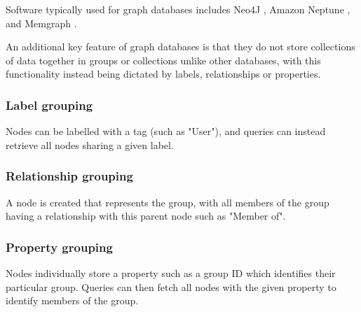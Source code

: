\para Software typically used for graph databases includes Neo4J \autocite{neo4jNeo4jGraphDatabase2025}, Amazon 
Neptune \autocite{awsManagedGraphDatabase}, and Memgraph \autocite{memgraphMemgraphDatabase}.

\para An additional key feature of graph databases is that they do not store collections of data together in groups or collections 
unlike other databases, with this functionality instead being dictated by labels, relationships or properties. 

\subsubsection{Label grouping}
Nodes can be labelled with a tag (such as "User"), and queries can instead retrieve all nodes sharing a given label.

\subsubsection{Relationship grouping}
A node is created that represents the group, with all members of the group having a relationship with this parent node such as "Member of".

\subsubsection{Property grouping}
Nodes individually store a property such as a group ID which identifies their particular group. Queries can then fetch all nodes with the given 
property to identify members of the group.

